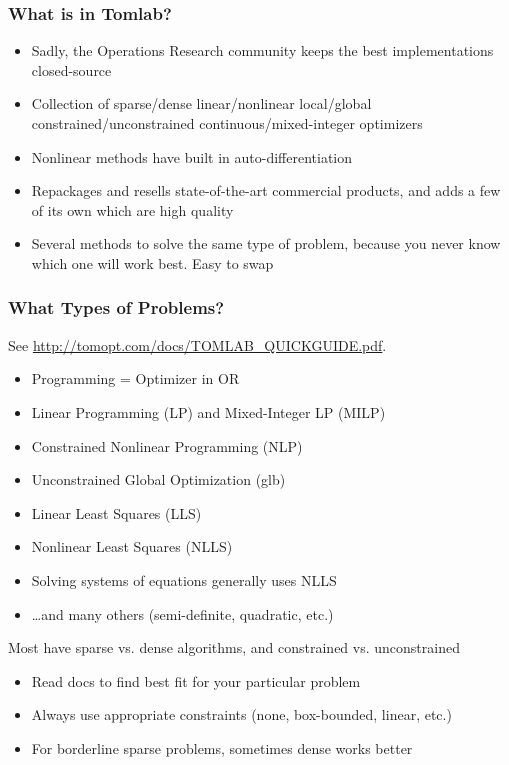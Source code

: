 \documentclass[nofootline]{etk-presentation}
\begin{document}
	\begin{frame}\frametitle{}
	\bigskip
	\bigskip
	\bigskip	
	\begin{center}
		{\huge {}}
	\end{center}
\end{frame}
\begin{frame}[fragile]	\frametitle{What is in Tomlab?}
	\begin{itemize}
		\item Sadly, the Operations Research community keeps the best implementations closed-source
		\item Collection of sparse/dense linear/nonlinear local/global constrained/unconstrained continuous/mixed-integer optimizers
		\item Nonlinear methods have built in auto-differentiation
		\item Repackages and resells state-of-the-art commercial products, and adds a few of its own which are high quality		
		\item Several methods to solve the same type of problem, because you never know which one will work best.  Easy to swap
	\end{itemize}
\end{frame}

\begin{frame}[fragile]	\frametitle{What Types of Problems?}
	See \url{http://tomopt.com/docs/TOMLAB_QUICKGUIDE.pdf}. 
	\begin{itemize}
		\item Programming = Optimizer in OR
		\item Linear Programming (LP) and Mixed-Integer LP (MILP)
		\item Constrained Nonlinear Programming (NLP)
		\item Unconstrained Global Optimization (glb)
		\item Linear Least Squares (LLS)
		\item Nonlinear Least Squares (NLLS)
		\item Solving systems of equations generally uses NLLS
		\item \ldots and many others (semi-definite, quadratic, etc.)
	\end{itemize}
\medskip
	Most have sparse vs. dense algorithms, and constrained vs. unconstrained
	\begin{itemize}
		\item Read docs to find best fit for your particular problem
		\item Always use appropriate constraints (none, box-bounded, linear, etc.)
		\item For borderline sparse problems, sometimes dense works better
	\end{itemize}
\end{frame}
\end{document}
